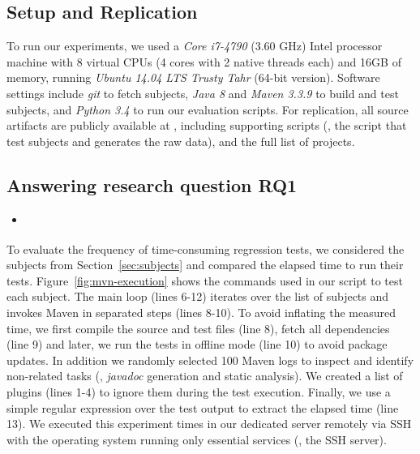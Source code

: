 \subsection{Setup and Replication}
\label{sec:setup}

To run our experiments, we used a \emph{Core i7-4790} (3.60 GHz) Intel
processor machine with 8 virtual CPUs (4 cores with 2 native threads
each) and 16GB of memory, running \emph{Ubuntu 14.04 LTS Trusty Tahr}
(64-bit version). Software settings include \emph{git} to fetch
subjects, \emph{Java 8} and \emph{Maven 3.3.9} to build and test subjects,
and \emph{Python 3.4} to run our evaluation scripts. For replication,
all source artifacts are publicly available at ,
including supporting scripts (\eg, the script that test subjects and
generates the raw data), and the full list of projects. 

\subsection{Answering research question RQ1}
\label{sec:rqA}

\begin{itemize}
    \item \emph{\RQA}
\end{itemize}

To evaluate the frequency of time-consuming regression tests, we
considered the \numSubjs{} subjects from Section~\ref{sec:subjects} and
compared the elapsed time to run their tests.
Figure~\ref{fig:mvn-execution} shows the commands used in our script
to test each subject. The main loop (lines 6-12) iterates over the
list of subjects and invokes Maven in separated steps (lines 8-10). To
avoid inflating the measured time, we first compile the source and
test files (line 8), fetch all dependencies (line 9) and later, we run
the tests in offline mode (line 10) to avoid package updates. In
addition we randomly selected 100 Maven logs to inspect and identify
non-related tasks (\eg, \emph{javadoc} generation and static
analysis). We created a list of plugins (lines 1-4) to ignore them
during the test execution.  Finally, we use a simple regular
expression over the test output to extract the elapsed time (line 13).
We executed this experiment  times in our dedicated server
remotely via SSH with the operating system running only essential
services (\eg, the SSH server). 

